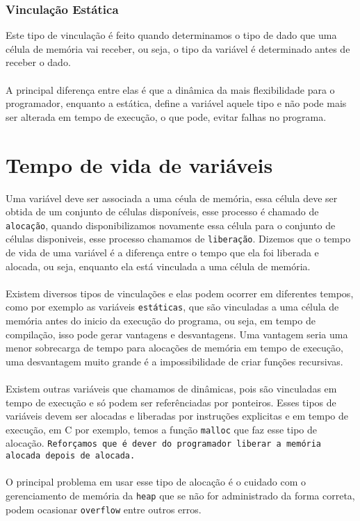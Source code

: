 \documentclass[12pt, onecolumn]{article}
\begin{document}
		\subsubsection{\hspace{1cm}Vinculação Estática}
	Este tipo de vinculação é feito quando determinamos o tipo de dado que 
	uma célula de memória vai receber, ou seja, o tipo da variável é determinado
	antes de receber o dado.\\
	\\
	A principal diferença entre elas é que a dinâmica da mais flexibilidade 
	para o programador, enquanto a estática, define a variável aquele tipo e 
	não pode mais ser alterada em tempo de execução, o que pode, evitar falhas
	no programa.
	
	\section{Tempo de vida de variáveis}
	Uma variável deve ser associada a uma céula de memória, essa célula deve
	ser obtida de um conjunto de células disponíveis, esse processo é chamado
	de \texttt{alocação}, quando disponibilizamos novamente essa célula
	para o conjunto de células disponiveis, esse processo chamamos de
	\texttt{liberação}. Dizemos que o tempo de vida de uma variável é 
	a diferença entre o tempo que ela foi liberada e alocada, ou seja, 
	enquanto ela está vinculada a uma célula de memória.\\
	\\
	Existem diversos tipos de vinculações e elas podem ocorrer em diferentes
	tempos, como por exemplo as variáveis \texttt{estáticas}, que são 
	vinculadas a uma célula de memória antes do inicio da execução do programa,
	ou seja, em tempo de compilação, isso pode gerar vantagens e desvantagens.
	Uma vantagem seria uma menor sobrecarga de tempo para alocações de memória
	em tempo de execução, uma desvantagem muito grande é a impossibilidade
	de criar funções recursivas.\\
	\\
	Existem outras variáveis que chamamos de dinâmicas, pois são vinculadas
	em tempo de execução e só podem ser referênciadas por ponteiros. 
	Esses tipos de variáveis devem ser alocadas e liberadas por instruções
	explicitas e em tempo de execução, em C por exemplo, temos a função 
	\texttt{malloc}	que faz esse tipo de alocação. \texttt{Reforçamos que é dever
	do programador liberar a memória alocada depois de alocada.}\\
	\\
	O principal problema em usar esse tipo de alocação é o cuidado com o 
	gerenciamento de memória da \texttt{heap} que se não for administrado
	da forma correta, podem ocasionar \texttt{overflow} entre outros erros.
\end{document}

